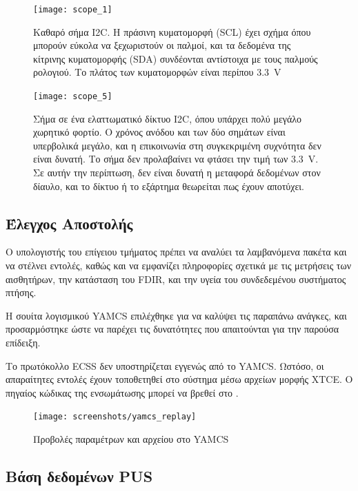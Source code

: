 \documentclass[a4paper,nobib]{tufte-book}
\begin{document}
\begin{figure}[h]
	\texttt{[image: scope\_1]}
	\caption{Καθαρό σήμα \acs{I2C}. Η πράσινη κυματομορφή (\acf{SCL}) έχει σχήμα όπου μπορούν εύκολα να ξεχωριστούν οι παλμοί, και τα δεδομένα της κίτρινης κυματομορφής (\acf{SDA}) συνδέονται αντίστοιχα με τους παλμούς ρολογιού. Το πλάτος των κυματομορφών είναι περίπου \SI{3.3}{\volt}}
	\label{subfig:i2c_clean}
\end{figure}

\begin{figure}[h]
	\texttt{[image: scope\_5]}
	\caption{Σήμα σε ένα ελαττωματικό δίκτυο \acs{I2C}, όπου υπάρχει πολύ μεγάλο χωρητικό φορτίο. Ο χρόνος ανόδου και των δύο σημάτων είναι υπερβολικά μεγάλο, και η επικοινωνία στη συγκεκριμένη συχνότητα δεν είναι δυνατή. Το σήμα δεν προλαβαίνει να φτάσει την τιμή των \SI{3.3}{\volt}. Σε αυτήν την περίπτωση, δεν είναι δυνατή η μεταφορά δεδομένων στον δίαυλο, και το δίκτυο ή το εξάρτημα θεωρείται πως έχουν αποτύχει.}
	\label{subfig:i2c_dirty}
\end{figure}

\FloatBarrier

\subsection{Έλεγχος Αποστολής}

Ο υπολογιστής του επίγειου τμήματος πρέπει να αναλύει τα λαμβανόμενα πακέτα και να στέλνει εντολές, καθώς και να εμφανίζει πληροφορίες σχετικά με τις μετρήσεις των αισθητήρων, την κατάσταση του \ac{FDIR}, και την υγεία του συνδεδεμένου συστήματος πτήσης.

Η σουίτα λογισμικού \acs{YAMCS} \autocite{sela_yamcs_lightweight_2012} επιλέχθηκε για να καλύψει τις παραπάνω ανάγκες, και προσαρμόστηκε ώστε να παρέχει τις δυνατότητες που απαιτούνται για την παρούσα επίδειξη.

Το πρωτόκολλο \ac{ECSS} \autocite{ECSS-E-ST-70-41C} δεν υποστηρίζεται εγγενώς από το \acs{YAMCS}. Ωστόσο, οι απαραίτητες εντολές έχουν τοποθετηθεί στο σύστημα μέσω αρχείων μορφής \ac{XTCE}.\autocite{simon_xtce_standard_2004} Ο πηγαίος κώδικας της ενσωμάτωσης μπορεί να βρεθεί στο .

\begin{figure}[h]
	\texttt{[image: screenshots/yamcs\_replay]}
	\caption{Προβολές παραμέτρων και αρχείου στο \acs{YAMCS}}
\end{figure}

\subsection{Βάση δεδομένων \acs{PUS}}
\end{document}
